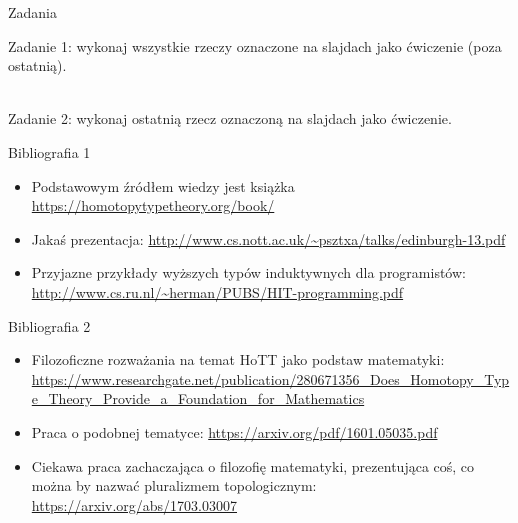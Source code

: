 \documentclass{beamer}
\begin{document}
\begin{frame}{Zadania}

Zadanie 1: wykonaj wszystkie rzeczy oznaczone na slajdach jako ćwiczenie (poza ostatnią). \\~\

Zadanie 2: wykonaj ostatnią rzecz oznaczoną na slajdach jako ćwiczenie.

\end{frame}

\begin{frame}{Bibliografia 1}
\begin{itemize}
	\item Podstawowym źródłem wiedzy jest książka \url{https://homotopytypetheory.org/book/}
	\item Jakaś prezentacja: \url{http://www.cs.nott.ac.uk/~psztxa/talks/edinburgh-13.pdf}
	\item Przyjazne przykłady wyższych typów induktywnych dla programistów: \url{http://www.cs.ru.nl/~herman/PUBS/HIT-programming.pdf}
\end{itemize}
\end{frame}

\begin{frame}{Bibliografia 2}
\begin{itemize}
	\item Filozoficzne rozważania na temat HoTT jako podstaw matematyki: \url{https://www.researchgate.net/publication/280671356_Does_Homotopy_Type_Theory_Provide_a_Foundation_for_Mathematics}
	\item Praca o podobnej tematyce: \url{https://arxiv.org/pdf/1601.05035.pdf}
	\item Ciekawa praca zachaczająca o filozofię matematyki, prezentująca coś, co można by nazwać pluralizmem topologicznym: \url{https://arxiv.org/abs/1703.03007}
\end{itemize}
\end{frame}
\end{document}
